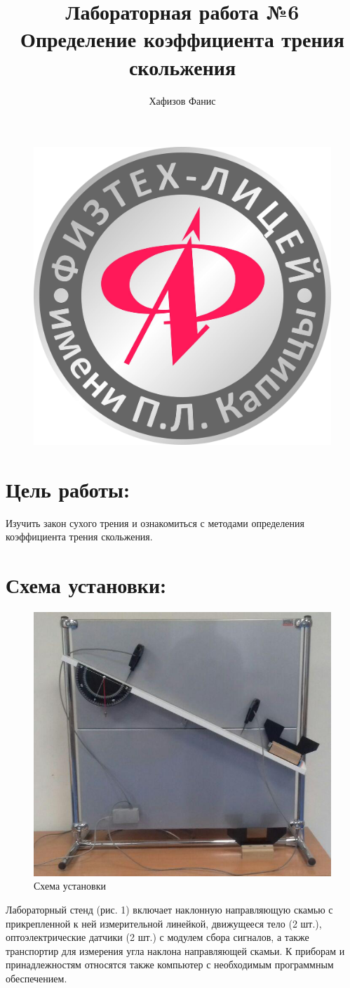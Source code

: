 \documentclass[12pt]{article}
\title{Лабораторная работа №6\\Определение коэффициента трения скольжения}
\author{Хафизов Фанис}
\begin{document}
	\begin{figure}
		\centering
		\includegraphics[width=0.3\linewidth]{logo}
	\end{figure}
	\maketitle
	\newpage
	\section{Цель работы:}
	Изучить закон сухого трения и ознакомиться с методами определения коэффициента трения скольжения.
	\section{Схема установки:}
	\begin{figure}[h]
		\centering
		\includegraphics[width=0.7\linewidth]{image1}
		\caption{Схема установки}
		\label{fig:image1}
	\end{figure}
	Лабораторный стенд (рис. 1) включает наклонную направляющую скамью
	с прикрепленной к ней измерительной линейкой, движущееся тело (2 шт.),
	оптоэлектрические датчики (2 шт.) с модулем сбора сигналов, а также
	транспортир для измерения угла наклона направляющей скамьи. К приборам
	и принадлежностям относятся также компьютер с необходимым программным
	обеспечением.
\end{document}
